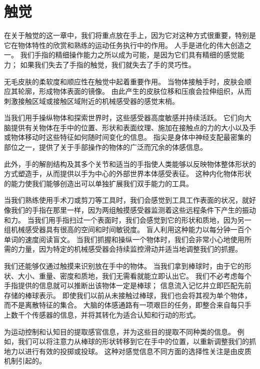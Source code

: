 \chapter{触觉} \label{chap:chap19}
在关于触觉的这一章中，我们将重点放在手上，因为它对这种方式很重要，特别是它在物体特性的欣赏和熟练的运动任务执行中的作用。 
人手是进化的伟大创造之一。 
我们手指的精细操作能力之所以成为可能，是因为它们具有精细的感觉能力； 
如果我们失去了手指的触觉，我们就失去了手的灵巧性。


无毛皮肤的柔软度和顺应性在触觉中起着重要作用。 
当物体接触手时，皮肤会顺应其轮廓，形成物体表面的镜像。 
由此产生的皮肤位移和压痕会拉伸组织，从而刺激接触区域或接触区域附近的机械感受器的感觉末梢。


当我们用手操纵物体和探索世界时，这些感受器高度敏感并持续活跃。 
它们向大脑提供有关物体在手中的位置、形状和表面纹理、施加在接触点的力的大小以及手或物体移动时这些特征如何随时间变化的信息。 
指尖是身体中神经支配最密集的部位之一，提供了关于手部操作的物体的广泛而冗余的体感信息。


此外，手的解剖结构及其多个关节和适当的手指使人类能够以反映物体整体形状的方式塑造手，从而提供以手为中心的外部世界本体感受表征。 
这种内化物体形状的能力使我们能够创造出可以单独扩展我们双手能力的工具。


当我们熟练使用手术刀或剪刀等工具时，我们会感觉到工具工作表面的状况，就好像我们的手指在那里一样，因为两组触摸感受器监测着这些远程条件下产生的振动和力。
当我们用手指扫过一个表面时，我们会感觉到它的形状和质地，因为另一组机械感受器具有很高的空间和时间敏锐度。 
盲人利用这种能力以每分钟一百个单词的速度阅读盲文。 
当我们抓握和操纵一个物体时，我们会非常小心地使用所需的力量，因为特定的机械感受器会持续监控滑动并适当地调整我们的抓握。


我们还能够仅通过触摸来识别放在手中的物体。 
当我们拿到棒球时，由于它的形状、大小、重量、密度和质地，我们无需看就能立即认出它。 
我们不必考虑每个手指提供的信息就可以推断出该物体一定是棒球； 
信息流入记忆并立即匹配先前存储的棒球表示。 
即使我们以前从未接触过棒球，我们也会将其视为单个物体，而不是离散特征的集合。
大脑的体感通路有一项艰巨的任务，即整合来自每只手上数千个传感器的信息，并将其转化为适合认知和行动的形式。


为运动控制和认知目的提取感官信息，并为这些目的提取不同种类的信息。 
例如，我们可以将注意力从棒球的形状转移到它在手中的位置，以重新调整我们的抓地力以进行有效的投掷或投球。 
这种对感觉信息不同方面的选择性关注是由皮质机制引起的。



